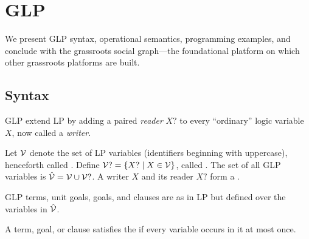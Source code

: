 \section{GLP}
\label{sec:glp}

We present GLP syntax,  operational semantics,  programming examples, and conclude with the grassroots social graph---the foundational platform on which other grassroots platforms are built.

\subsection{Syntax}
\label{sec:glp-ext}

GLP extend LP by adding a paired \emph{reader} $X?$ to every ``ordinary'' logic variable $X$, now called a \emph{writer}.

\begin{definition}
\label{def:glp-variables}
Let $\mathcal{V}$ denote the set of LP variables (identifiers beginning with uppercase), henceforth called . Define $\mathcal{V}? = \{X? \mid X \in \mathcal{V}\}$, called . The set of all GLP variables is $\hat{\mathcal{V}} = \mathcal{V} \cup \mathcal{V}?$. A writer $X$ and its reader $X?$ form a .
\end{definition}
GLP terms, unit goals, goals, and clauses are as in LP but defined over the variables in $\hat{\mathcal{V}}$.

\begin{definition}
\label{def:so-invariant}
A term, goal, or clause satisfies the  if every variable occurs in it at most once.
\end{definition}

